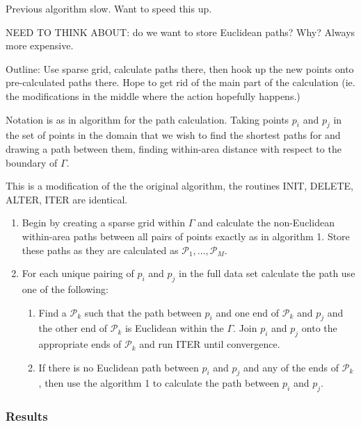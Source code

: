 \documentclass[a4paper,10pt]{article}
\begin{document}
Previous algorithm slow. Want to speed this up. 

NEED TO THINK ABOUT: do we want to store Euclidean paths? Why? Always more expensive.


Outline: Use sparse grid, calculate paths there, then hook up the new points onto pre-calculated paths there. Hope to get rid of the main part of the calculation (ie. the modifications in the middle where the action hopefully happens.)

Notation is as in algorithm for the path calculation. Taking points $p_i$ and $p_j$ in the set of points in the domain that we wish to find the shortest paths for and drawing a path between them, finding within-area distance with respect to the boundary of $\Gamma$.

This is a modification of the the original algorithm, the routines INIT, DELETE, ALTER, ITER are identical.

\begin{enumerate}
 \item Begin by creating a sparse grid within $\Gamma$ and calculate the non-Euclidean within-area paths between all pairs of points exactly as in algorithm 1. Store these paths as they are calculated as $\mathcal{P}_1,\ldots, \mathcal{P}_M$.
 
\item For each unique pairing of $p_i$ and $p_j$ in the full data set calculate the path use one of the following:

\begin{enumerate}

\item Find a $\mathcal{P}_k$ such that the path between $p_i$ and one end of $\mathcal{P}_k$ and $p_j$ and the other end of $\mathcal{P}_k$ is Euclidean within the $\Gamma$. Join $p_i$ and $p_j$ onto the appropriate ends of $\mathcal{P}_k$ and run ITER until convergence.

\item If there is no Euclidean path between $p_i$ and $p_j$ and any of the ends of $\mathcal{P}_k$, then use the algorithm 1 to calculate the path between $p_i$ and $p_j$. 

\end{enumerate}
\end{enumerate}


\subsubsection{Results}
\end{document}
